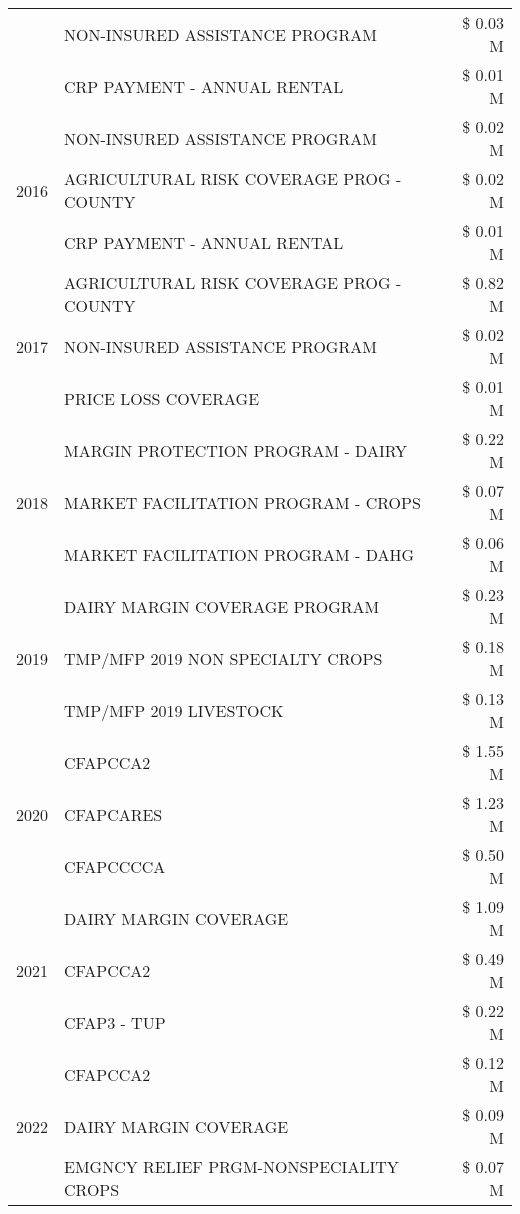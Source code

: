 \begin{tabular}{llr}
 & NON-INSURED ASSISTANCE PROGRAM & \$ 0.03 M \\
 & CRP PAYMENT - ANNUAL RENTAL & \$ 0.01 M \\
\cline{1-3}
\multirow[t]{3}{*}{2016} & NON-INSURED ASSISTANCE PROGRAM & \$ 0.02 M \\
 & AGRICULTURAL RISK COVERAGE PROG - COUNTY & \$ 0.02 M \\
 & CRP PAYMENT - ANNUAL RENTAL & \$ 0.01 M \\
\cline{1-3}
\multirow[t]{3}{*}{2017} & AGRICULTURAL RISK COVERAGE PROG - COUNTY & \$ 0.82 M \\
 & NON-INSURED ASSISTANCE PROGRAM & \$ 0.02 M \\
 & PRICE LOSS COVERAGE & \$ 0.01 M \\
\cline{1-3}
\multirow[t]{3}{*}{2018} & MARGIN PROTECTION PROGRAM - DAIRY & \$ 0.22 M \\
 & MARKET FACILITATION PROGRAM - CROPS & \$ 0.07 M \\
 & MARKET FACILITATION PROGRAM - DAHG & \$ 0.06 M \\
\cline{1-3}
\multirow[t]{3}{*}{2019} & DAIRY MARGIN COVERAGE PROGRAM & \$ 0.23 M \\
 & TMP/MFP 2019 NON SPECIALTY CROPS & \$ 0.18 M \\
 & TMP/MFP 2019 LIVESTOCK & \$ 0.13 M \\
\cline{1-3}
\multirow[t]{3}{*}{2020} & CFAPCCA2 & \$ 1.55 M \\
 & CFAPCARES & \$ 1.23 M \\
 & CFAPCCCCA & \$ 0.50 M \\
\cline{1-3}
\multirow[t]{3}{*}{2021} & DAIRY MARGIN COVERAGE & \$ 1.09 M \\
 & CFAPCCA2 & \$ 0.49 M \\
 & CFAP3 - TUP & \$ 0.22 M \\
\cline{1-3}
\multirow[t]{3}{*}{2022} & CFAPCCA2 & \$ 0.12 M \\
 & DAIRY MARGIN COVERAGE & \$ 0.09 M \\
 & EMGNCY RELIEF PRGM-NONSPECIALITY CROPS & \$ 0.07 M \\
\cline{1-3}
\bottomrule
\end{tabular}
